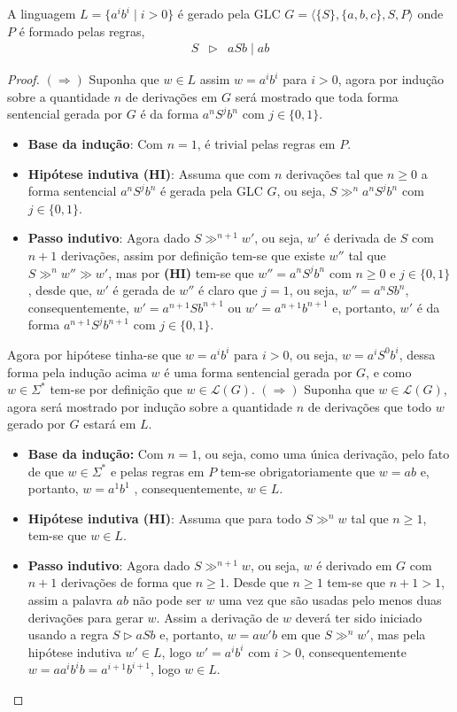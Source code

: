\begin{example}\label{exe:LinguagemGLC}
	A linguagem $L = \{a^ib^i \mid i  > 0\}$ é gerado pela GLC $G = \langle \{S\}, \{a,b,c\}, S, P\rangle$ onde $P$ é formado pelas regras,
	\begin{eqnarray*}
		S & \rhd & aSb \mid ab
	\end{eqnarray*}
	\begin{proof}
		$(\Rightarrow)$ Suponha que $w \in L$ assim $w = a^ib^i$ para $i  > 0$, agora por indução sobre a quantidade $n$ de derivações em $G$ será mostrado que toda forma sentencial gerada por $G$ é da forma $a^nS^jb^n$ com $j \in \{0, 1\}$. 
		\begin{itemize}
			\item[ ] \textbf{Base da indução}: Com $n = 1$, é trivial pelas regras em $P$. 
			\item[ ] \textbf{Hipótese indutiva (HI)}: Assuma que com $n$ derivações tal que $n \geq 0$ a forma sentencial $a^nS^jb^n$ é gerada pela GLC $G$, ou seja, $S \gg^n a^nS^jb^n$ com $j \in \{0, 1\}$. 
			\item[ ] \textbf{Passo indutivo}: Agora dado $S \gg^{n+1} w'$, ou seja, $w'$ é derivada de $S$ com $n+1$ derivações, assim por definição tem-se que existe $w''$ tal que $S \gg^n w'' \gg w'$, mas por \textbf{(HI)} tem-se que $w'' =  a^nS^jb^n$ com $n \geq 0$ e $j \in \{0, 1\}$,  desde que, $w'$ é gerada de $w''$ é claro que $j = 1$, ou seja, $w'' = a^nSb^n$, consequentemente, $w' = a^{n+1}Sb^{n+1}$ ou $w' = a^{n+1}b^{n+1}$ e, portanto, $w'$ é da forma $a^{n+1}S^jb^{n+1}$ com $j \in \{0, 1\}$. 
		\end{itemize}
		Agora por hipótese tinha-se que $w = a^ib^i$ para $i  > 0$, ou seja, $w = a^iS^0b^i$, dessa forma pela indução acima $w$ é uma forma sentencial gerada por $G$, e como $w \in \Sigma^*$ tem-se por definição que $w \in \mathcal{L}(G)$. $(\Rightarrow)$ Suponha que $w \in \mathcal{L}(G)$, agora será mostrado por indução sobre a quantidade $n$ de derivações que todo $w$ gerado por $G$ estará em $L$.
		\begin{itemize}
			\item[ ] \textbf{Base da indução:} Com $n=1$, ou seja, como uma única derivação, pelo fato de que $w \in \Sigma^*$ e pelas regras em $P$ tem-se obrigatoriamente que $w = ab$ e, portanto, $w = a^1b^1$ , consequentemente, $w \in L$.
			\item[ ] \textbf{Hipótese indutiva (HI)}: Assuma que para todo $S \gg^n w$ tal que $n \geq 1$, tem-se que $w \in L$.
			\item[ ] \textbf{Passo indutivo}: Agora dado $S \gg^{n+1} w$, ou seja, $w$ é derivado em $G$ com $n + 1$ derivações de forma que $n \geq 1$. Desde que $n  \geq 1$ tem-se que $n + 1  > 1$, assim a palavra $ab$ não pode ser $w$ uma vez que são usadas pelo menos duas derivações para gerar $w$. Assim a derivação de $w$ deverá ter sido iniciado usando a regra $S \rhd aSb$ e, portanto, $w = aw'b$ em que $S \gg^n w'$, mas pela hipótese indutiva $w' \in L$, logo $w' = a^ib^i$ com $i > 0$, consequentemente $w = aa^ib^ib = a^{i+1}b^{i+1}$, logo $w \in L$.
		\end{itemize}
	\end{proof}
\end{example}

